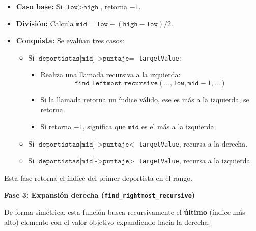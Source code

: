 \begin{itemize}
    \item \textbf{Caso base:} Si \(\texttt{low} > \texttt{high}\), retorna $-1$.
    
    \item \textbf{División:} Calcula \(\texttt{mid} = \texttt{low} + (\texttt{high} - \texttt{low}) / 2\).
    
    \item \textbf{Conquista:} Se evalúan tres casos:
    \begin{itemize}
        \item Si \(\texttt{deportistas[mid]->puntaje} =\) \texttt{targetValue}:
        \begin{itemize}
            \item Realiza una llamada recursiva a la izquierda: \[
            \texttt{find\_leftmost\_recursive}(\text{...}, \texttt{low}, \texttt{mid} - 1, \text{\ldots})
            \]
            \item Si la llamada retorna un índice válido, ese es más a la izquierda, se retorna.
            \item Si retorna $-1$, significa que \(\texttt{mid}\) es el más a la izquierda.
        \end{itemize}
        \item Si \(\texttt{deportistas[mid]->puntaje} <\) \texttt{targetValue}, recursa a la derecha.
        \item Si \(\texttt{deportistas[mid]->puntaje} >\) \texttt{targetValue}, recursa a la izquierda.
    \end{itemize}
\end{itemize}

Esta fase retorna el índice del primer deportista en el rango.

\textbf{Fase 3: Expansión derecha (\texttt{find\_rightmost\_recursive})}

De forma simétrica, esta función busca recursivamente el \textbf{último} (índice más alto) elemento con el valor objetivo expandiendo hacia la derecha:

